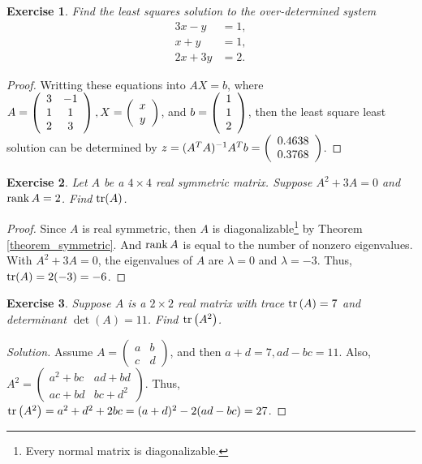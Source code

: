 \documentclass[11pt]{book}
\newtheorem{exercise}{Exercise}[section]
\theoremstyle{definition}
\numberwithin{equation}{chapter}
\begin{document}
\begin{exercise}
Find the least squares solution to the over-determined system%
\begin{align*}
3x-y  &  =1,\\
x+y  &  =1,\\
2x+3y  &  =2.
\end{align*}
\end{exercise}
\begin{proof}
Writting these equations into $AX=b$, where $A = \left(\begin{array}
    [c]{cc}%
    3 & -1\\
    1 & 1\\
    2 & 3
    \end{array}\right), X = \left(\begin{array}
    [c]{c}%
    x\\
    y\\
    \end{array}\right)$, and $b = \left(\begin{array}
    [c]{c}%
    1\\
    1\\
    2
    \end{array}\right)$, then the least square least solution can be determined by $z = (A^TA)^{-1}A^T b = \left(\begin{array}
    [c]{c}%
    0.4638\\
    0.3768\\
    \end{array}\right)
    $.
\end{proof}

\medskip

\begin{exercise} 
Let $A$ be a $4 \times 4$ real symmetric matrix. Suppose $A^2 + 3A = 0$ and $\rank A = 2$. Find ${\rm tr}(A)$.
\end{exercise}
\begin{proof}
Since $A$ is real symmetric, then $A$ is diagonalizable\footnote{Every normal matrix is diagonalizable\cite{21}.} by Theorem \ref{theorem_symmetric}. And $\rank A$ is equal to the number of nonzero eigenvalues. With $A^2 + 3A = 0$, the eigenvalues of $A$ are $\lambda = 0$ and $\lambda = -3$. Thus, ${\rm tr}(A) = 2(-3) = -6$.
\end{proof}

\medskip

\begin{exercise}\label{exer_trace}
Suppose $A$ is a $2 \times 2$ real matrix with trace ${\rm tr}\left(A \right) = 7$ and determinant $\det (A) = 11$. Find ${\rm tr}\left(A^2 \right)$.
\end{exercise}
\begin{proof}[Solution]
Assume $A = \begin{pmatrix} a & b \\ c & d \end{pmatrix}$, and then $a + d = 7, ad - bc = 11$. Also, $A^2 = \begin{pmatrix} a^2+bc &ad+bd \\ ac+bd & bc+d^2 \end{pmatrix}$. Thus, ${\rm tr}\left(A^2 \right) = a^2 + d^2 + 2bc = (a+d)^2 - 2(ad-bc) = 27$.
\end{proof}
\end{document}
